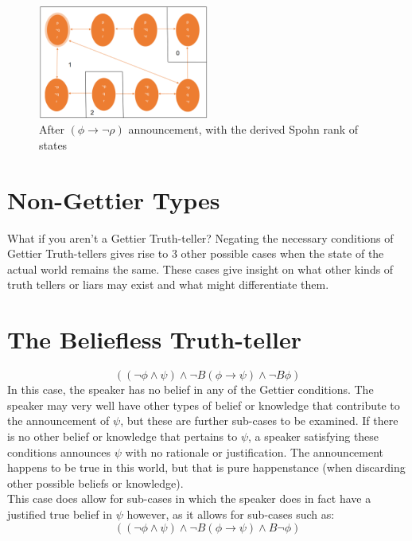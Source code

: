 \documentclass[12pt, titlepage, twoside, a4paper]{report}
\begin{document}
{\begin{figure}[h]
  \centering
  \includegraphics[width=0.5\textwidth]{slide21.eps}
  \caption{After $(\phi \to \neg \rho)$ announcement, with the derived Spohn rank of states}
\end{figure}

\section{Non-Gettier Types}
What if you aren't a Gettier Truth-teller? Negating the necessary conditions of Gettier Truth-tellers gives rise to 3 other possible cases when the state of the actual world remains the same. These cases give insight on what other kinds of truth tellers or liars may exist and what might differentiate them.

\section{The Beliefless Truth-teller}
$$((\neg \phi \wedge \psi) \wedge \neg B(\phi \to \psi) \wedge \neg B \phi)$$
In this case, the speaker has no belief in any of the Gettier conditions. The speaker may very well have other types of belief or knowledge that contribute to the announcement of $\psi$, but these are further sub-cases to be examined. If there is no other belief or knowledge that pertains to $\psi$, a speaker satisfying these conditions announces $\psi$ with no rationale or justification. The announcement happens to be true in this world, but that is pure happenstance (when discarding other possible beliefs or knowledge).\\
This case does allow for sub-cases in which the speaker does in fact have a justified true belief in $\psi$ however, as it allows for sub-cases such as:
$$((\neg \phi \wedge \psi) \wedge \neg B(\phi \to \psi) \wedge B \neg \phi)$$

}
\end{document}
